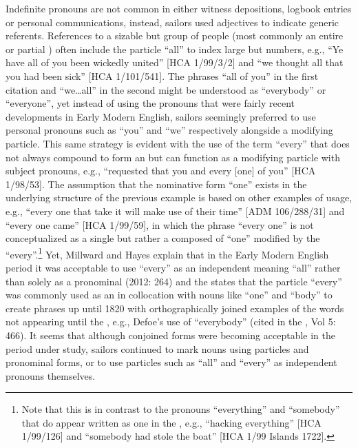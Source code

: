 Indefinite pronouns are not common in either witness depositions, logbook entries or personal communications, instead, sailors used adjectives to indicate generic referents. References to a sizable but  group of people (most commonly an entire or partial ) often include the particle “all” to index large but  numbers, e.g., “Ye have all of you been wickedly united” [HCA 1/99/3/2] and “we thought all that you had been sick” [HCA 1/101/541]. The phrases “all of you” in the first citation and “we…all” in the second might be understood as “everybody” or “everyone”, yet instead of using the  pronouns that were fairly recent developments in Early Modern English, sailors seemingly preferred to use personal pronouns such as “you” and “we” respectively alongside a modifying particle. This same strategy is evident with the use of the term “every” that does not always compound to form an   but can function as a modifying  particle with subject pronouns, e.g., “requested that you and every [one] of you” [HCA 1/98/53]. The assumption that the nominative form “one” exists in the underlying structure of the previous example is based on other examples of usage, e.g., “every one that take it will make use of their time” [ADM 106/288/31] and “every one came” [HCA 1/99/59], in which the phrase “every one” is not conceptualized as a single  but rather a  composed of “one” modified by the  “every”.\footnote{Note that this is in contrast to the  pronouns “everything” and “somebody” that do appear written as one  in the , e.g., “hacking everything” [HCA 1/99/126] and “somebody had stole the boat” [HCA 1/99  Islands 1722].}  Yet, Millward and Hayes explain that in the Early Modern English period it was acceptable to use “every” as an independent  meaning “all” rather than solely as a pronominal  (2012: 264) and the \citet{oed1989} states that the particle “every” was commonly used as an  in collocation with nouns like “one” and “body” to create   phrases up until 1820 with orthographically joined examples of the words not appearing until the , e.g.,  Defoe’s use of “everybody” (cited in the \citealt{oed1989}, Vol 5: 466). It seems that although conjoined forms were becoming acceptable in the period under study, sailors continued to mark  nouns using  particles and pronominal forms, or to use particles such as “all” and “every” as independent pronouns themselves.

